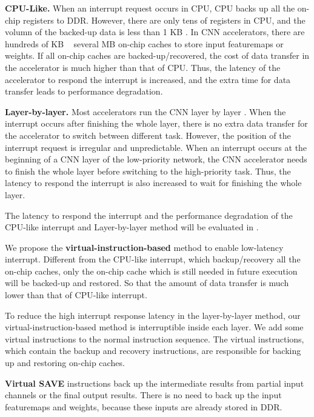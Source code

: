 \textbf{CPU-Like.}
When an interrupt request occurs in CPU, CPU backs up all the on-chip registers to DDR. However, there are only tens of registers in CPU, and the volumn of the backed-up data is less than 1 KB \cite{furber2000arm}. In CNN accelerators, there are hundreds of KB ~ several MB on-chip caches \cite{qiu2016going, guo2017angel} to store input featuremaps or weights. If all on-chip caches are backed-up/recovered, the cost of data transfer in the accelerator is much higher than that of CPU. Thus, the latency of the accelerator to respond the interrupt is increased, and the extra time for data transfer leads to performance degradation.

\textbf{Layer-by-layer.}
Most accelerators run the CNN layer by layer \cite{qiu2016going,guo2017angel}. When the interrupt occurs after finishing the whole layer, there is no extra data transfer for the accelerator to switch between different task. However, the position of the interrupt request is irregular and unpredictable. When an interrupt occurs at the beginning of a CNN layer of the low-priority network, the CNN accelerator needs to finish the whole layer before switching to the high-priority task. Thus, the latency to respond the interrupt is also increased to wait for finishing the whole layer.

The latency to respond the interrupt and the performance degradation of the CPU-like interrupt and Layer-by-layer method will be evaluated in .


We propose the \textbf{virtual-instruction-based} method to enable low-latency interrupt. Different from the CPU-like interrupt, which backup/recovery all the on-chip caches, only the on-chip cache which is still needed in future execution will be backed-up and restored. So that the amount of data transfer is much lower than that of CPU-like interrupt.

To reduce the high interrupt response latency in the layer-by-layer method, our virtual-instruction-based method is interruptible inside each layer. We add some virtual instructions to the normal instruction sequence.
The virtual instructions, which contain the backup and recovery instructions, are responsible for backing up and restoring on-chip caches. 

\textbf{Virtual SAVE} instructions back up the intermediate results from partial input channels or the final output results. There is no need to back up the input featuremaps and weights, because these inputs are already stored in DDR. 

